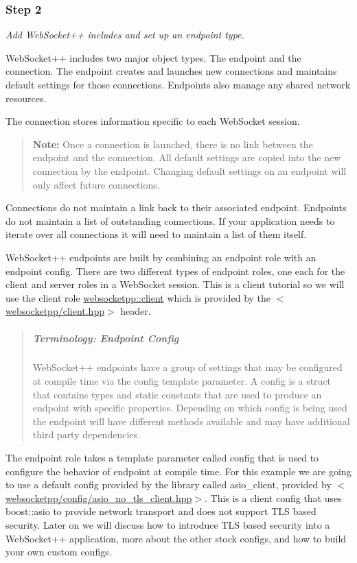 \subsubsection*{Step 2}

{\itshape Add Web\+Socket++ includes and set up an endpoint type.}

Web\+Socket++ includes two major object types. The endpoint and the connection. The endpoint creates and launches new connections and maintains default settings for those connections. Endpoints also manage any shared network resources.

The connection stores information specific to each Web\+Socket session.

\begin{quote}
{\bfseries Note\+:} Once a connection is launched, there is no link between the endpoint and the connection. All default settings are copied into the new connection by the endpoint. Changing default settings on an endpoint will only affect future connections. \end{quote}
Connections do not maintain a link back to their associated endpoint. Endpoints do not maintain a list of outstanding connections. If your application needs to iterate over all connections it will need to maintain a list of them itself.

Web\+Socket++ endpoints are built by combining an endpoint role with an endpoint config. There are two different types of endpoint roles, one each for the client and server roles in a Web\+Socket session. This is a client tutorial so we will use the client role {\ttfamily \hyperlink{classwebsocketpp_1_1client}{websocketpp\+::client}} which is provided by the {\ttfamily $<$\hyperlink{client_8hpp_source}{websocketpp/client.\+hpp}$>$} header.

\begin{quote}
\subparagraph*{Terminology\+: Endpoint Config}

Web\+Socket++ endpoints have a group of settings that may be configured at compile time via the {\ttfamily config} template parameter. A config is a struct that contains types and static constants that are used to produce an endpoint with specific properties. Depending on which config is being used the endpoint will have different methods available and may have additional third party dependencies. \end{quote}


The endpoint role takes a template parameter called {\ttfamily config} that is used to configure the behavior of endpoint at compile time. For this example we are going to use a default config provided by the library called {\ttfamily asio\+\_\+client}, provided by {\ttfamily $<$\hyperlink{asio__no__tls__client_8hpp_source}{websocketpp/config/asio\+\_\+no\+\_\+tls\+\_\+client.\+hpp}$>$}. This is a client config that uses boost\+::asio to provide network transport and does not support T\+LS based security. Later on we will discuss how to introduce T\+LS based security into a Web\+Socket++ application, more about the other stock configs, and how to build your own custom configs.

